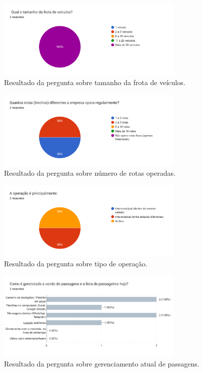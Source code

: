 \begin{apendicesenv}
  \begin{figure}[htbp]
    \centering
    \includegraphics[width=0.8\textwidth]{imagens/imagem2.png}
    \caption{Resultado da pergunta sobre tamanho da frota de veículos.}
    \label{fig:resultado2}
  \end{figure}

  \begin{figure}[htbp]
    \centering
    \includegraphics[width=0.8\textwidth]{imagens/imagem3.png}
    \caption{Resultado da pergunta sobre número de rotas operadas.}
    \label{fig:resultado3}
  \end{figure}

  \begin{figure}[htbp]
    \centering
    \includegraphics[width=0.8\textwidth]{imagens/imagem4.png}
    \caption{Resultado da pergunta sobre tipo de operação.}
    \label{fig:resultado4}
  \end{figure}

  \begin{figure}[htbp]
    \centering
    \includegraphics[width=0.8\textwidth]{imagens/imagem5.png}
    \caption{Resultado da pergunta sobre gerenciamento atual de passagens.}
    \label{fig:resultado5}
  \end{figure}


\end{apendicesenv}
